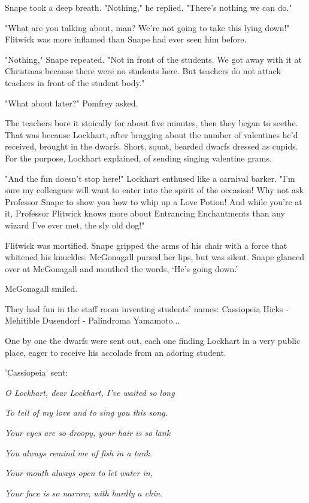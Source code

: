 \documentclass[a4paper,11pt]{article}
\begin{document}
Snape took a deep breath. "Nothing," he replied. "There's nothing we can do."

"What are you talking about, man? We're not going to take this lying down!" Flitwick was more inflamed than Snape had ever seen him before.

"Nothing," Snape repeated. "Not in front of the students. We got away with it at Christmas because there were no students here. But teachers do not attack teachers in front of the student body."

"What about later?" Pomfrey asked.

The teachers bore it stoically for about five minutes, then they began to seethe. That was because Lockhart, after bragging about the number of valentines he'd received, brought in the dwarfs. Short, squat, bearded dwarfs dressed as cupids. For the purpose, Lockhart explained, of sending singing valentine grams.

"And the fun doesn't stop here!" Lockhart enthused like a carnival barker. "I'm sure my colleagues will want to enter into the spirit of the occasion! Why not ask Professor Snape to show you how to whip up a Love Potion! And while you're at it, Professor Flitwick knows more about Entrancing Enchantments than any wizard I've ever met, the sly old dog!"

Flitwick was mortified. Snape gripped the arms of his chair with a force that whitened his knuckles. McGonagall pursed her lips, but was silent. Snape glanced over at McGonagall and mouthed the words, `He's going down.'

McGonagall smiled.

They had fun in the staff room inventing students' names: Cassiopeia Hicks - Mehitible Dusendorf - Palindroma Yamamoto...

One by one the dwarfs were sent out, each one finding Lockhart in a very public place, eager to receive his accolade from an adoring student.

'Cassiopeia' sent:

\emph{O Lockhart, dear Lockhart, I've waited so long}

\emph{To tell of my love and to sing you this song.}

\emph{Your eyes are so droopy, your hair is so lank}

\emph{You always remind me of fish in a tank.}

\emph{Your mouth always open to let water in,}

\emph{Your face is so narrow, with hardly a chin.}
\end{document}
